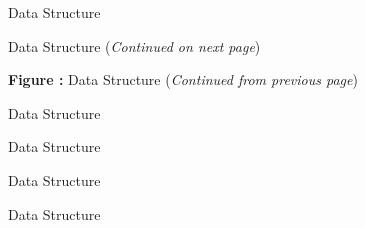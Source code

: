 \clearpage
\begin{figure}[!htp]
\centering

\caption{ Data Structure}
\label{f:WallFunction}
\end{figure}

\clearpage
\begin{figure}[!htp]
\centering
\resizebox{\linewidth}{!}{}
\caption[ Data Structure]{ Data Structure (\textit{Continued on next page})}
\label{f:Zone}
\end{figure}
\clearpage
\begin{figure}[!htp]
\centering
\resizebox{\linewidth}{!}{}
\par\vspace{\abovecaptionskip}
\textbf{Figure :}  Data Structure (\textit{Continued from previous page})
\end{figure}

\clearpage
\begin{figure}[!htp]
\centering

\caption{ Data Structure}
\label{f:ZoneBC}
\end{figure}

\clearpage
\begin{figure}[!htp]
\centering
\resizebox{!}{\textheight-2\baselineskip}{}
%
\caption{ Data Structure}
\label{f:ZoneGridConnectivity}
\end{figure}

\clearpage
\begin{figure}[!htp]
\centering

\caption{ Data Structure}
\label{f:ZoneIterativeData}
\end{figure}

\clearpage
\begin{figure}[!htp]
\centering
\resizebox{\linewidth}{!}{}
%
\caption{ Data Structure}
\label{f:ZoneSubRegion}
\end{figure}


